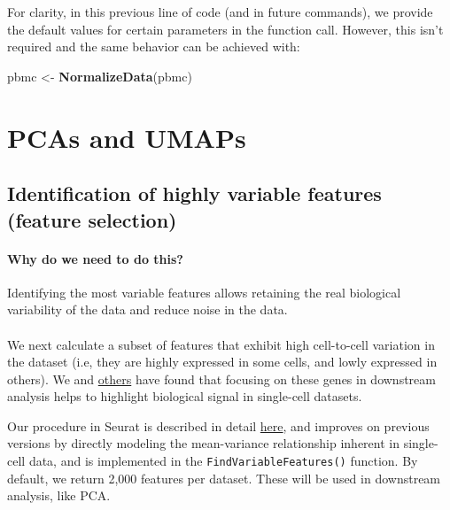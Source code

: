 \documentclass[
]{book}
\newenvironment{Shaded}{\begin{snugshade}}{\end{snugshade}}
\newcommand{\FunctionTok}[1]{\textcolor[rgb]{0.13,0.29,0.53}{\textbf{#1}}}
\newcommand{\NormalTok}[1]{#1}
\newcommand{\OtherTok}[1]{\textcolor[rgb]{0.56,0.35,0.01}{#1}}
\begin{document}
For clarity, in this previous line of code (and in future commands), we provide the default values for certain parameters in the function call. However, this isn't required and the same behavior can be achieved with:

\begin{Shaded}
\begin{Highlighting}[]
\NormalTok{pbmc }\OtherTok{\textless{}{-}} \FunctionTok{NormalizeData}\NormalTok{(pbmc)}
\end{Highlighting}
\end{Shaded}

\chapter{PCAs and UMAPs}\label{reducedims}

\section{Identification of highly variable features (feature selection)}\label{identification-of-highly-variable-features-feature-selection}

\subsubsection*{Why do we need to do this?}\label{why-do-we-need-to-do-this-2}

Identifying the most variable features allows retaining the real biological variability of the data and reduce noise in the data.

\subsubsection*{}\label{section-4}

We next calculate a subset of features that exhibit high cell-to-cell variation in the dataset (i.e, they are highly expressed in some cells, and lowly expressed in others). We and \href{https://www.nature.com/articles/nmeth.2645}{others} have found that focusing on these genes in downstream analysis helps to highlight biological signal in single-cell datasets.

Our procedure in Seurat is described in detail \href{https://doi.org/10.1016/j.cell.2019.05.031}{here}, and improves on previous versions by directly modeling the mean-variance relationship inherent in single-cell data, and is implemented in the \texttt{FindVariableFeatures()} function. By default, we return 2,000 features per dataset. These will be used in downstream analysis, like PCA.
\end{document}
